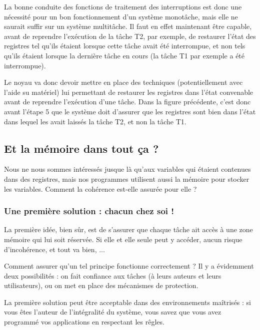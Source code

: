    La bonne conduite des fonctions de traitement des interruptions est
donc une nécessité pour un bon fonctionnement d'un système monotâche,
mais elle ne saurait suffir sur un système multitâche. Il faut en
effet maintenant être capable, avant de reprendre l'exécution de la
tâche T2, par exemple, de restaurer l'état des registres tel qu'ils
étaient lorsque cette tâche avait été interrompue, et non tels qu'ils
étaient lorsque la dernière tâche en cours (la tâche T1 par exemple a
été interrompue).

   Le noyau va donc devoir mettre en place des techniques
(potentiellement avec l'aide su matériel) lui permettant de restaurer
les registres dans l'état convenable avant de reprendre l'exécution
d'une tâche. Dans la figure précédente, c'est donc avant l'étape 5 que
le système doit d'assurer que les registres sont bien dans l'état dans
lequel les avait laissés la tâche T2, et non la tâche T1.

%
\subsection{Et la mémoire dans tout ça ?}

   Nous ne nous sommes intéressés jusque là qu'aux variables qui
étaient contenues dans des registres, mais nos programmes utilisent
aussi la mémoire pour stocker les variables. Comment la cohérence
est-elle assurée pour elle ?

%
\subsubsection{Une première solution : chacun chez soi !}

   La première idée, bien sûr, est de s'assurer que chaque tâche ait
accès à une zone mémoire qui lui soit réservée. Si elle et elle seule
peut y accéder, aucun risque d'incohérence, et tout va bien, ...

   Comment assurer qu'un tel principe fonctionne correctement ? Il y a
évidemment deux possibilités : on fait confiance aux tâches (à leurs
auteurs et leurs utilisateurs), ou on met en place des mécanismes de
protection.

   La première solution peut être acceptable dans des environnements
maîtrisés : si vous êtes l'auteur de l'intégralité du système, vous
savez que vous avez programmé vos applications en respectant les
rêgles. 

